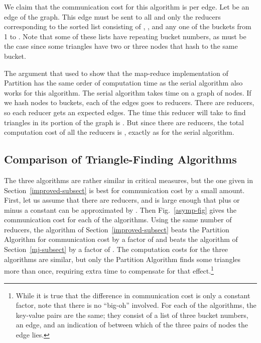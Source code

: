 We claim that the communication cost for this algorithm is  per edge.
Let  be an edge of the graph.  This edge must be sent to all and only the reducers corresponding to the sorted list consisting of , , and any one of the buckets from 1 to .  Note that some of these lists have repeating bucket numbers, as must be the case since some triangles have two or three nodes that hash to the same bucket.

The argument that \cite{SV11} used to show that the map-reduce implementation of Partition has the same order of computation time as the serial algorithm also works for this algorithm.
The serial algorithm takes  time on a graph of  nodes.  If we hash nodes to  buckets, each of the  edges goes to  reducers.  There are  reducers, so each reducer gets an expected  edges.  The time this reducer will take to find triangles in its portion of the graph is .  But since there are  reducers, the total computation cost of all the reducers is , exactly as for the serial algorithm.

\subsection{Comparison of Triangle-Finding Algorithms}
\label{tri-compare-subsect}

The three algorithms are rather similar in critical measures, but the one given in Section~\ref{improved-subsect} is best for communication cost by a small amount.  First, let us assume that there are  reducers, and  is large enough that  plus or minus a constant can be approximated by .  Then Fig.~\ref{asymp-fig} gives the communication cost for each of the algorithms.
Using the same number of reducers, the algorithm of Section~\ref{improved-subsect} beats the Partition Algorithm for communication cost by a factor of  and beats the algorithm of Section~\ref{mj-subsect} by a factor of .
The computation costs for the three algorithms are similar, but only the Partition Algorithm finds some triangles more than once, requiring extra time to compensate for that effect.\footnote{While it is true that the difference in communication cost is only a constant factor, note that there is no ``big-oh'' involved.  For each of the algorithms, the key-value pairs are the same; they consist of a list of three bucket numbers, an edge, and an indication of between which of the three pairs of nodes the edge lies.}

